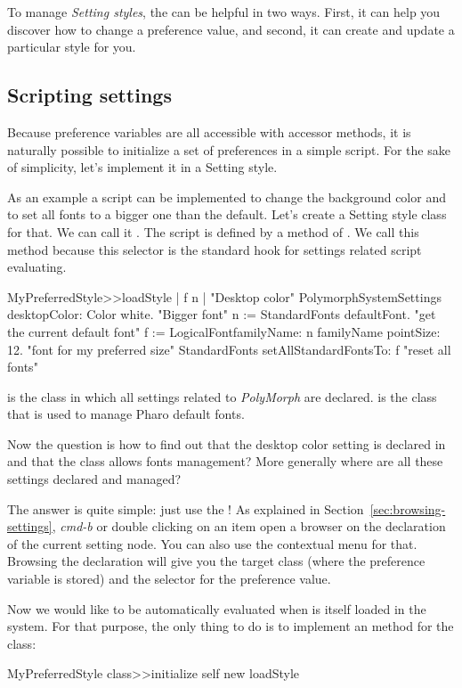 \documentclass[a4paper,10pt,twoside]{book}
\begin{document}
{To manage \textit{Setting styles}, the \setbrowser can be helpful in two ways. First, it can help you discover how to change a preference value, and second, it can create and update a particular style for you.

\subsection{Scripting settings}
Because preference variables are all accessible with accessor methods, it is naturally possible to initialize a set of preferences in a simple script. For the sake of simplicity, let's implement it in a Setting style.

As an example a script can be implemented to change the background color and to set all fonts to a bigger one than the default. Let's create a Setting style class for that. We can call it . The script is defined by a method of . We call this method  because this selector is the standard hook for settings related script evaluating. 

\begin{code}{}
MyPreferredStyle>>loadStyle
	| f n |
	"Desktop color"
	PolymorphSystemSettings desktopColor: Color white.
	"Bigger font"
	n := StandardFonts defaultFont. "get the current default font"
	f := LogicalFontfamilyName: n familyName pointSize: 12. "font for my preferred size"
	StandardFonts setAllStandardFontsTo: f "reset all fonts"
\end{code}
 is the class in which all settings related to \textit{PolyMorph} are declared.  is the class that is used to manage Pharo default fonts.

Now the question is how to find out that the desktop color setting is declared in  and that the  class allows fonts management? More generally where are all these settings declared and managed? 

The answer is quite simple: just use the \setbrowser! As explained in Section~\ref{sec:browsing-settings}, \textit{cmd-b} or double clicking on an item open a browser on the declaration of the current setting node. You can also use the contextual menu for that. Browsing the declaration will give you the target class (where the preference variable is stored) and the selector for the preference value.

Now we would like  to be automatically evaluated when  is itself loaded in the system. For that purpose, the only thing to do is to implement an  method for the  class:
\begin{code}{}
MyPreferredStyle class>>initialize
	self new loadStyle
\end{code}

}
\end{document}
